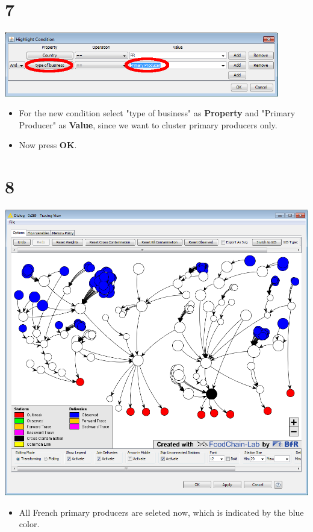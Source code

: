 \documentclass{beamer}
\begin{document}
\section{7}
\begin{frame}
	\begin{center}
  		\includegraphics[width=0.9\textwidth]{7.png}
	\end{center}
	\begin{itemize}
		\item For the new condition select "type of business" as \textbf{Property} and "Primary Producer" as \textbf{Value}, since we want to cluster primary producers only.
		\item Now press \textbf{OK}.
	\end{itemize}
\end{frame}


\section{8}
\begin{frame}
	\begin{center}
  		\includegraphics[height=0.6\textheight]{8.png}
	\end{center}
	\begin{itemize}
		\item All French primary producers are seleted now, which is indicated by the blue color.
	\end{itemize}
\end{frame}
\end{document}
